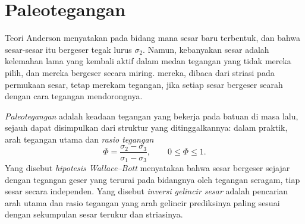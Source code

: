 \begin{omfigure}

\par{}\label{fig:b3:structural-analysis:flinn}
\end{omfigure}

\section{Paleotegangan}\label{sec:b3:structural-analysis:palaeostress}

Teori Anderson menyatakan pada bidang mana sesar baru terbentuk, dan bahwa sesar-sesar itu bergeser
tegak lurus $\sigma_2$. Namun, kebanyakan sesar adalah kelemahan lama
yang kembali aktif dalam medan tegangan yang tidak mereka pilih, dan mereka bergeser
secara miring.  mereka, dibaca dari striasi pada permukaan
sesar, tetap merekam tegangan, jika setiap sesar bergeser searah
dengan cara tegangan mendorongnya.

\begin{definition}\label{def:b3:structural-analysis:palaeostress}
\emph{Paleotegangan} adalah keadaan tegangan yang bekerja pada
batuan di masa lalu, sejauh dapat disimpulkan dari struktur yang ditinggalkannya:
dalam praktik, arah tegangan utama dan
\emph{rasio tegangan}
\[
  \Phi = \frac{\sigma_2 - \sigma_3}{\sigma_1 - \sigma_3}, \qquad 0 \le \Phi
  \le 1 .
\]
Yang disebut \emph{hipotesis Wallace--Bott} menyatakan
bahwa sesar bergeser sejajar dengan tegangan geser yang terurai pada bidangnya oleh
tegangan seragam, tiap sesar secara independen. Yang disebut \emph{inversi gelincir
sesar} adalah pencarian arah utama dan rasio tegangan
yang arah gelincir prediksinya paling sesuai dengan sekumpulan
sesar terukur dan striasinya.
\end{definition}

